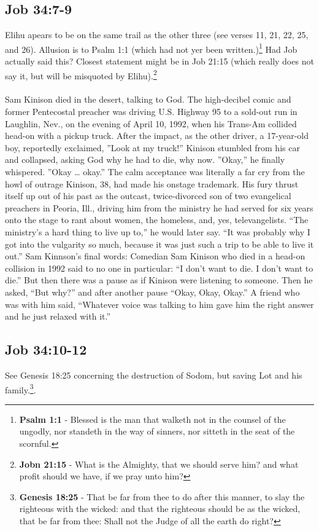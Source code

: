 \subsection{Job 34:7-9}
Elihu apears to be on the same trail as the other three (see verses 11, 21, 22, 25, and 26). Allusion is to Psalm 1:1 (which had not yer been written.)\footnote{\textbf{Psalm 1:1} - Blessed is the man that walketh not in the counsel of the ungodly, nor standeth in the way of sinners, nor sitteth in the seat of the scornful.} Had Job actually said this? Closest statement might be in Job 21:15 (which really does not say it, but will be misquoted by Elihu).\footnote{\textbf{Jobn 21:15} - What is the Almighty, that we should serve him? and what profit should we have, if we pray unto him?}\\
\\
\noindent Sam Kinison died in the desert, talking to God. The high-decibel comic and former Pentecostal preacher was driving U.S. Highway 95 to a sold-out run in Laughlin, Nev., on the evening of April 10, 1992, when his Trans-Am collided head-on with a pickup truck. After the impact, as the other driver, a 17-year-old boy, reportedly exclaimed, ”Look at my truck!” Kinison stumbled from his car and collapsed, asking God why he had to die, why now. ”Okay,” he finally whispered. ”Okay … okay.”  The calm acceptance was literally a far cry from the howl of outrage Kinison, 38, had made his onstage trademark. His fury thrust itself up out of his past as the outcast, twice-divorced son of two evangelical preachers in Peoria, Ill., driving him from the ministry he had served for six years onto the stage to rant about women, the homeless, and, yes, televangelists. ``The ministry’s a hard thing to live up to,'' he would later say. ``It was probably why I got into the vulgarity so much, because it was just such a trip to be able to live it out.'' Sam Kinnson's final words: Comedian Sam Kinison who died in a head-on collision in 1992 said to no one in particular: ``I don’t want to die. I don’t want to die.'' But then there was a pause as if Kinison were listening to someone. Then he asked, “But why?” and after another pause ``Okay, Okay, Okay.'' A friend who was with him said, ``Whatever voice was talking to him gave him the right answer and he just relaxed with it.''\cite{thomas_20220309}

\subsection{Job 34:10-12}
See Genesis 18:25 concerning the destruction of Sodom, but saving Lot and his family.\footnote{\textbf{Genesis 18:25} - That be far from thee to do after this manner, to slay the righteous with the wicked: and that the righteous should be as the wicked, that be far from thee: Shall not the Judge of all the earth do right?}.\cite{thomas_20220309}

